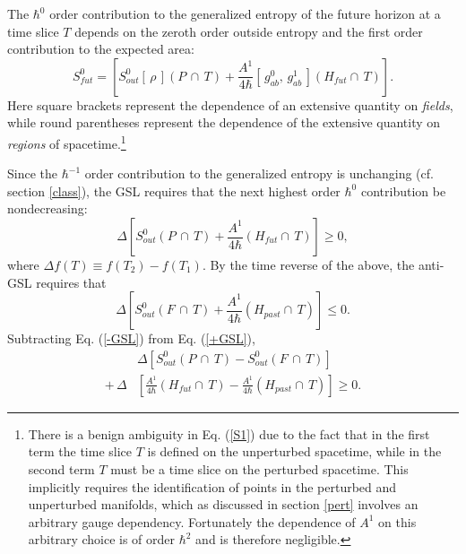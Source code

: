 \documentclass[11pt]{article}
\begin{document}
The $\hbar^0$ order contribution to the generalized entropy of the future horizon at a time slice $T$ depends on the zeroth order outside entropy and the first order contribution to the expected area:
\begin{equation}\label{S1}
S_{fut}^{0} = \left[ S_{out}^{0}[\,\rho\,](P\,\cap\,T) 
+ \frac{A^{1}}{4\hbar}[\,g_{ab}^{0},\,g_{ab}^{1}\,](H_{fut}\cap\,T) \right].
\end{equation}
Here square brackets represent the dependence of an extensive quantity on \emph{fields}, while round parentheses represent the dependence of the extensive quantity on \emph{regions} of spacetime.\footnote{There is a benign ambiguity in Eq. (\ref{S1}) due to the fact that in the first term the time slice $T$ is defined on the unperturbed spacetime, while in the second term $T$ must be a time slice on the perturbed spacetime.  This implicitly requires the identification of points in the perturbed and unperturbed manifolds, which as discussed in section \ref{pert} involves an arbitrary gauge dependency.  Fortunately the dependence of $A^{1}$ on this arbitrary choice is of order $\hbar^2$ and is therefore negligible.}

Since the $\hbar^{-1}$ order contribution to the generalized entropy is unchanging (cf. section \ref{class}), the GSL requires that the next highest order $\hbar^{0}$ contribution be nondecreasing:
\begin{equation}\label{+GSL}
\Delta \left[ S_{out}^{0}(P\,\cap\,T) + \frac{A^{1}}{4\hbar}(H_{fut}\cap\,T) \right] \ge 0,
\end{equation} 
where $\Delta f(T) \equiv f(T_2) - f(T_1)$.  By the time reverse of the above, the anti-GSL requires that
\begin{equation}\label{-GSL}
\Delta \left[ S_{out}^{0}(F\,\cap\,T) + 
\frac{A^{1}}{4\hbar}(H_{past}\cap\,T) \right] \le 0.
\end{equation}
Subtracting Eq. (\ref{-GSL}) from Eq. (\ref{+GSL}),
\begin{align}\label{dif1}
& \Delta \left[ S_{out}^{0}(P\,\cap\,T) 
- S_{out}^{0}(F\,\cap\,T) \right] \\ \label{dif2}
+\,\Delta &\left[ \frac{A^{1}}{4\hbar}(H_{fut}\cap\,T)
- \frac{A^{1}}{4\hbar}(H_{past}\cap\,T) \right] \ge 0.
\end{align}
\end{document}
